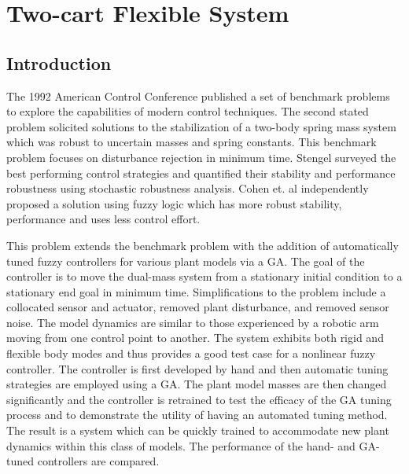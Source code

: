 \chapter{Two-cart Flexible System}\label{c:acc}
\section{Introduction}
The 1992 American Control Conference published a set of benchmark problems to explore the capabilities of
modern control techniques\cite{wie1992benchmark}. The second stated problem solicited solutions to the
stabilization of a two-body spring mass system which was robust to uncertain masses and spring constants. This
benchmark problem focuses on disturbance rejection in minimum time. Stengel\cite{stengel1992robustness}
surveyed the best performing control strategies and quantified their stability and performance robustness
using stochastic robustness analysis. Cohen et. al \cite{cohen:01jgcd} independently proposed a solution using
fuzzy logic which has more robust stability, performance and uses less control effort.

This problem extends the benchmark problem with the addition of automatically tuned fuzzy controllers for
various plant models via a GA. The goal of the controller is to move the dual-mass system from a stationary
initial condition to a stationary end goal in minimum time. Simplifications to the problem include a
collocated sensor and actuator, removed plant disturbance, and removed sensor noise. The model dynamics are
similar to those experienced by a robotic arm moving from one control point to another. The system exhibits
both rigid and flexible body modes and thus provides a good test case for a nonlinear fuzzy controller. The
controller is first developed by hand and then automatic tuning strategies are employed using a GA. The plant
model masses are then changed significantly and the controller is retrained to test the efficacy of the GA
tuning process and to demonstrate the utility of having an automated tuning method. The result is a system
which can be quickly trained to accommodate new plant dynamics within this class of models. The performance of
the hand- and GA-tuned controllers are compared. 

